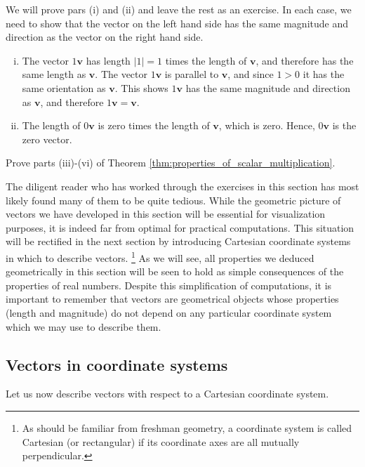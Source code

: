 \documentclass[12pt,letterpaper,reqno]{article}
\numberwithin{equation}{section}
\begin{document}
\begin{pf}
	We will prove pars (i) and (ii) and leave the rest as an exercise. In each case, we need to show that the vector on the left hand side has the same magnitude and direction as the vector on the right hand side. 
	\begin{enumerate}[(i)]
		\item The vector $1\mathbf{v}$ has length $|1|=1$ times the length of $\mathbf{v}$, and therefore has the same length as $\mathbf{v}$. The vector $1\mathbf{v}$ is parallel to $\mathbf{v}$, and since $1>0$ it has the same orientation as $\mathbf{v}$. This shows $1 \mathbf{v}$ has the same magnitude and direction as $\mathbf{v}$, and therefore $1 \mathbf{v}=\mathbf{v}$.
		\item The length of $0\mathbf{v}$ is zero times the length of $\mathbf{v}$, which is zero. Hence, $0\mathbf{v}$ is the zero vector. 
	\end{enumerate} 
\end{pf}

\begin{exercise}
Prove parts (iii)-(vi) of Theorem \ref{thm:properties_of_scalar_multiplication}.	
\end{exercise}

The diligent reader who has worked through the exercises in this section has most likely found many of them to be quite tedious. While the geometric picture of vectors we have developed in this section will be essential for visualization purposes, it is indeed far from optimal for practical computations. This situation will be rectified in the next section by introducing Cartesian coordinate systems in which to describe vectors. \footnote{As should be familiar from freshman geometry, a coordinate system is called Cartesian (or rectangular) if its coordinate axes are all mutually perpendicular.} As we will see, all properties we deduced geometrically in this section will be seen to hold as simple consequences of the properties of real numbers. Despite this simplification of computations, it is important to remember that vectors are geometrical objects whose properties (length and magnitude) do not depend on any particular coordinate system which we may use to describe them.

\subsection{Vectors in coordinate systems}\label{sec:coords}
Let us now describe vectors with respect to a Cartesian coordinate system.
\end{document}
